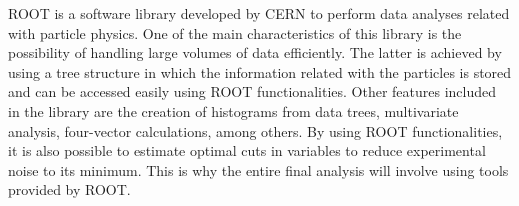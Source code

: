 ROOT is a software library developed by CERN to perform data analyses related with particle physics. One of the main characteristics of this library is the possibility of handling large volumes of data efficiently. The latter is achieved by using a tree structure in which the information related with the particles is stored and can be accessed easily using ROOT functionalities. Other features included in the library are the creation of histograms from data trees, multivariate analysis, four-vector calculations, among others. By using ROOT functionalities, it is also possible to estimate optimal cuts in variables to reduce experimental noise to its minimum. This is why the entire final analysis will involve using tools provided by ROOT.
